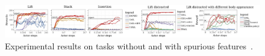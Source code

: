 \begin{figure}[t]
    \centering
    \includegraphics[width=1.0\textwidth]{Figures/images/trail/trail_results.jpg}
    \caption{Experimental results on tasks without and with spurious features~\cite{zolna2021task_relevant_ail}.}    
   \label{fig:trail_results}
\end{figure}

